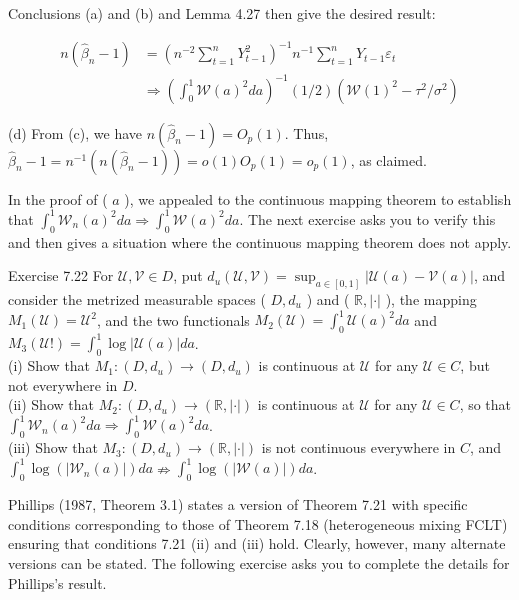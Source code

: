 \documentclass[10pt]{article}
\begin{document}
Conclusions (a) and (b) and Lemma 4.27 then give the desired result:

$$
\begin{aligned}
n\left(\hat{\beta}_{n}-1\right) & =\left(n^{-2} \sum_{t=1}^{n} Y_{t-1}^{2}\right)^{-1} n^{-1} \sum_{t=1}^{n} Y_{t-1} \varepsilon_{t} \\
& \Rightarrow\left(\int_{0}^{1} \mathcal{W}(a)^{2} d a\right)^{-1}(1 / 2)\left(\mathcal{W}(1)^{2}-\tau^{2} / \sigma^{2}\right)
\end{aligned}
$$

(d) From (c), we have $n\left(\hat{\beta}_{n}-1\right)=O_{p}(1)$. Thus, $\hat{\beta}_{n}-1=n^{-1}\left(n\left(\hat{\beta}_{n}-1\right)\right)= o(1) O_{p}(1)=o_{p}(1)$, as claimed.

In the proof of ( $a$ ), we appealed to the continuous mapping theorem to establish that $\int_{0}^{1} \mathcal{W}_{n}(a)^{2} d a \Rightarrow \int_{0}^{1} \mathcal{W}(a)^{2} d a$. The next exercise asks you to verify this and then gives a situation where the continuous mapping theorem does not apply.

Exercise 7.22 For $\mathcal{U}, \mathcal{V} \in D$, put $d_{u}(\mathcal{U}, \mathcal{V})=\sup _{a \in[0,1]}|\mathcal{U}(a)-\mathcal{V}(a)|$, and consider the metrized measurable spaces ( $D, d_{u}$ ) and ( $\mathbb{R},|\cdot|$ ), the mapping $M_{1}(\mathcal{U})=\mathcal{U}^{2}$, and the two functionals $M_{2}(\mathcal{U})=\int_{0}^{1} \mathcal{U}(a)^{2} d a$ and $M_{3}(\mathcal{U}!)= \int_{0}^{1} \log |\mathcal{U}(a)| d a$.\\
(i) Show that $M_{1}:\left(D, d_{u}\right) \rightarrow\left(D, d_{u}\right)$ is continuous at $\mathcal{U}$ for any $\mathcal{U} \in C$, but not everywhere in $D$.\\
(ii) Show that $M_{2}:\left(D, d_{u}\right) \rightarrow(\mathbb{R},|\cdot|)$ is continuous at $\mathcal{U}$ for any $\mathcal{U} \in C$, so that $\int_{0}^{1} \mathcal{W}_{n}(a)^{2} d a \Rightarrow \int_{0}^{1} \mathcal{W}(a)^{2} d a$.\\
(iii) Show that $M_{3}:\left(D, d_{u}\right) \rightarrow(\mathbb{R},|\cdot|)$ is not continuous everywhere in $C$, and $\int_{0}^{1} \log \left(\left|\mathcal{W}_{n}(a)\right|\right) d a \nRightarrow \int_{0}^{1} \log (|\mathcal{W}(a)|) d a$.

Phillips (1987, Theorem 3.1) states a version of Theorem 7.21 with specific conditions corresponding to those of Theorem 7.18 (heterogeneous mixing FCLT) ensuring that conditions 7.21 (ii) and (iii) hold. Clearly, however, many alternate versions can be stated. The following exercise asks you to complete the details for Phillips's result.
\end{document}
